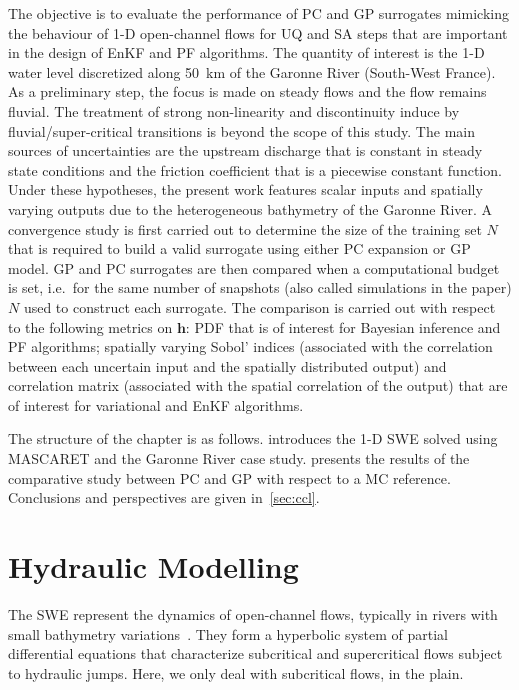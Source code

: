 The objective is to evaluate the performance of PC and GP surrogates mimicking the behaviour of 1-D open-channel flows for UQ and SA steps that are important in the design of EnKF and PF algorithms. The quantity of interest is the 1-D water level discretized along 50~km of the Garonne River (South-West France). As a preliminary step, the focus is made on steady flows and the flow remains fluvial. The treatment of strong non-linearity and discontinuity induce by fluvial/super-critical transitions is beyond the scope of this study. The main sources of uncertainties are the upstream discharge that is constant in steady state conditions and the friction coefficient that is a piecewise constant function. Under these hypotheses, the present work features scalar inputs and spatially varying outputs due to the heterogeneous bathymetry of the Garonne River. A convergence study is first carried out to determine the size of the training set $N$ that is required to build a valid surrogate using either PC expansion or GP model. GP and PC surrogates are then compared when a computational budget is set, i.e.~for the same number of snapshots (also called simulations in the paper) $N$ used to construct each surrogate. The comparison is carried out with respect to the following metrics on $\mathbf{h}$: PDF that is of interest for Bayesian inference and PF algorithms; spatially varying Sobol' indices (associated with the correlation between each uncertain input and the spatially distributed output) and correlation matrix (associated with the spatial correlation of the output) that are of interest for variational and EnKF algorithms.

The structure of the chapter is as follows.  introduces the 1-D SWE solved using MASCARET and the Garonne River case study.  presents the results of the comparative study between PC and GP with respect to a MC reference. Conclusions and perspectives are given in~\cref{sec:ccl}.

\section{Hydraulic Modelling}\label{sec:hydrau}

The SWE represent the dynamics of open-channel flows, typically in rivers with small bathymetry variations~\citep{horritt2002}. They form a hyperbolic system of partial differential equations that characterize subcritical and supercritical flows subject to hydraulic jumps. Here, we only deal with subcritical flows, in the plain.

